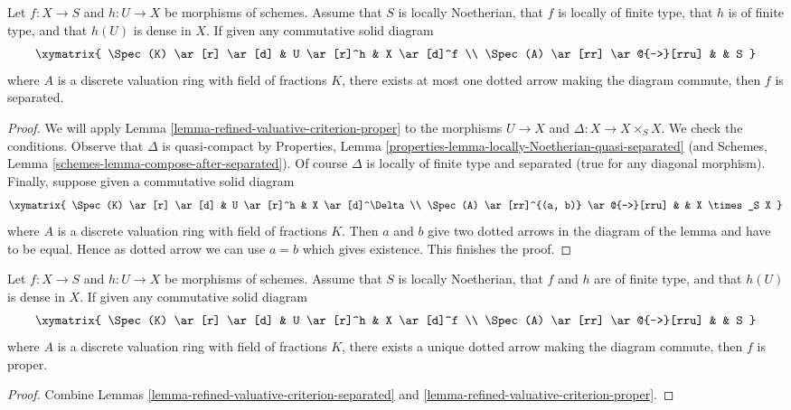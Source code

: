 \begin{lemma}
\label{lemma-refined-valuative-criterion-separated}
Let $f : X \to S$ and $h : U \to X$ be morphisms of schemes.
Assume that $S$ is locally Noetherian, that $f$ is locally of finite type,
that $h$ is of finite type, and that $h(U)$ is dense in $X$.
If given any commutative solid diagram
$$
\xymatrix{
\Spec(K) \ar[r] \ar[d] & U \ar[r]^h & X \ar[d]^f \\
\Spec(A) \ar[rr] \ar@{-->}[rru] & & S
}
$$
where $A$ is a discrete valuation ring with field of fractions $K$, there
exists at most one dotted arrow making the diagram commute, then $f$ is
separated.
\end{lemma}

\begin{proof}
We will apply Lemma \ref{lemma-refined-valuative-criterion-proper}
to the morphisms $U \to X$ and $\Delta : X \to X \times_S X$.
We check the conditions. Observe that $\Delta$ is quasi-compact by
Properties, Lemma \ref{properties-lemma-locally-Noetherian-quasi-separated}
(and Schemes, Lemma \ref{schemes-lemma-compose-after-separated}).
Of course $\Delta$ is locally of finite type and separated (true
for any diagonal morphism).
Finally, suppose given a commutative solid diagram
$$
\xymatrix{
\Spec(K) \ar[r] \ar[d] & U \ar[r]^h & X \ar[d]^\Delta \\
\Spec(A) \ar[rr]^{(a, b)} \ar@{-->}[rru] & & X \times_S X
}
$$
where $A$ is a discrete valuation ring with field of fractions $K$.
Then $a$ and $b$ give two dotted arrows in the diagram of the lemma
and have to be equal. Hence as dotted arrow we can use $a = b$
which gives existence. This finishes the proof.
\end{proof}

\begin{lemma}
\label{lemma-refined-valuative-criterion-universally-closed}
Let $f : X \to S$ and $h : U \to X$ be morphisms of schemes.
Assume that $S$ is locally Noetherian, that $f$ and $h$ are of finite type, and
that $h(U)$ is dense in $X$. If given any commutative solid diagram
$$
\xymatrix{
\Spec(K) \ar[r] \ar[d] & U \ar[r]^h & X \ar[d]^f \\
\Spec(A) \ar[rr] \ar@{-->}[rru] & & S
}
$$
where $A$ is a discrete valuation ring with field of fractions $K$, there
exists a unique dotted arrow making the diagram commute, then $f$ is proper.
\end{lemma}

\begin{proof}
Combine Lemmas \ref{lemma-refined-valuative-criterion-separated} and
\ref{lemma-refined-valuative-criterion-proper}.
\end{proof}









